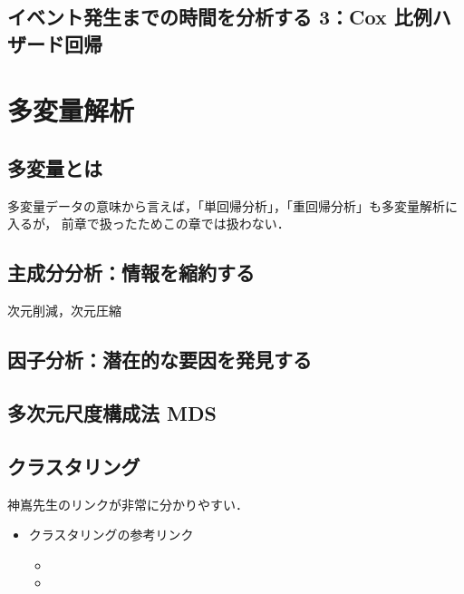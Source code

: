 \section{イベント発生までの時間を分析する 3：Cox 比例ハザード回帰}


\chapter{多変量解析}

\section{多変量とは}

多変量データの意味から言えば，「単回帰分析」，「重回帰分析」も多変量解析に入るが，
前章で扱ったためこの章では扱わない．

\section{主成分分析：情報を縮約する}

次元削減，次元圧縮

\section{因子分析：潜在的な要因を発見する}
\section{多次元尺度構成法 MDS}
\section{クラスタリング}

神嶌先生のリンクが非常に分かりやすい．

\begin{itemize}
  \item クラスタリングの参考リンク
        \begin{itemize}
          \item {}
          \item {}
        \end{itemize}
\end{itemize}

